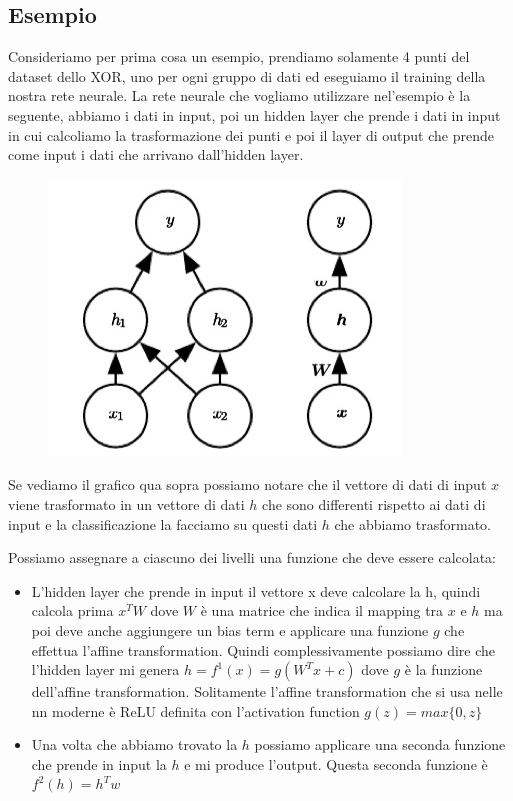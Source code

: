 \documentclass[14pt]{extreport}
\begin{document}
\subsection{Esempio}

Consideriamo per prima cosa un esempio, prendiamo solamente 4 punti del dataset dello XOR, uno per ogni gruppo di dati ed eseguiamo il training della
nostra rete neurale. La rete neurale che vogliamo utilizzare nel'esempio è la seguente, abbiamo i dati in input, poi un hidden layer che prende i dati
in input in cui calcoliamo la trasformazione dei punti e poi il layer di output che prende come input i dati che arrivano dall'hidden layer.

\begin{figure}[H]
	\centering
	\includegraphics[width=0.7\linewidth]{356.jpeg}
\end{figure}

Se vediamo il grafico qua sopra possiamo notare che il vettore di dati di input $x$ viene trasformato in un vettore di dati $h$ che sono differenti
rispetto ai dati di input e la classificazione la facciamo su questi dati $h$ che abbiamo trasformato.

Possiamo assegnare a ciascuno dei livelli una funzione che deve essere calcolata:
\begin{itemize}
	\item L'hidden layer che prende in input il vettore x deve calcolare la h, quindi calcola prima $x^TW$ dove $W$ è una matrice che indica il
	      mapping tra $x$ e $h$ ma poi deve anche aggiungere un bias term e applicare una funzione $g$ che effettua l'affine transformation. Quindi
	      complessivamente possiamo dire che l'hidden layer mi genera $h = f^1(x) = g(W^Tx+c)$ dove $g$ è la funzione dell'affine transformation.
	      Solitamente l'affine transformation che si usa nelle nn moderne è ReLU definita con l'activation function $g(z) = max\{0,z\}$
	\item Una volta che abbiamo trovato la $h$ possiamo applicare una seconda funzione che prende in input la $h$ e mi produce l'output. Questa
	seconda funzione è $f^2(h)=h^Tw$
\end{itemize}
\end{document}

